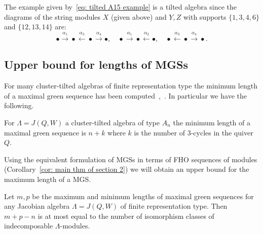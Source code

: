 \documentclass[ALCO,ThmDefs,Unicode,epreuves]{cedram}
\begin{document}
The example given by~\eqref{eq: tilted A15 example} is a tilted algebra since the diagrams of the string modules $X$ (given above) and $Y,Z$ with supports $\{1,3,4,6\}$ and $\{12,13,14\}$ \resp  are:
\[
\bullet\xrightarrow{\alpha_1} \bullet\xleftarrow{\alpha_3} \bullet\xrightarrow{\alpha_4} \bullet
,\quad
	\bullet \xrightarrow{\alpha_1}\bullet\xleftarrow{\alpha_2} \bullet,\quad 
	\bullet \xleftarrow{\alpha_3} \bullet
	\xrightarrow{\alpha_4}\bullet .
\]


\subsection{Upper bound for lengths of MGSs}

For many cluster-tilted algebras of finite representation type the minimum length of a maximal green sequence has been computed~\cite{CDRSW},~\cite{GMS}. In particular we have the following.



\begin{theo}\label{thm: minimum length}
For $\Lambda=J(Q,W)$ a cluster-tilted algebra of type $A_n$ the minimum length of a maximal green sequence is $n+k$ where $k$ is the number of 3-cycles in the quiver $Q$.
\end{theo}

Using the equivalent formulation of MGSs in terms of FHO sequences of modules (Corollary~\ref{cor: main thm of section 2}) we will obtain an upper bound for the maximum length of a MGS.

\begin{prop}\label{prop: maximal and minimal mgs}
Let $m,p$ be the maximum and minimum lengths of maximal green sequences for any Jacobian algebra $\Lambda=J(Q,W)$ of finite representation type. Then $m+p-n$ is at most equal to the number of isomorphism classes of indecomposable $\Lambda$-modules.  
\end{prop}
\end{document}

